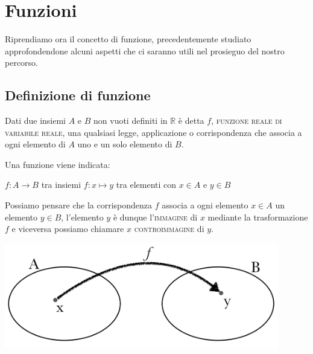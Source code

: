 

\chapter{Funzioni}

Riprendiamo ora il concetto di funzione, precedentemente studiato  
approfondendone alcuni aspetti che ci saranno utili nel prosieguo del 
nostro percorso.

\section{Definizione di funzione}
\begin{definizione}
  Dati due insiemi \(A\) e \(B\) non vuoti definiti in \(\mathbb{R}\) è detta 
\(f\), \textsc{funzione reale di variabile reale}, una qualsiasi legge, 
applicazione o corrispondenza che associa a ogni elemento di \(A\) uno e un 
solo elemento di \(B\).
\end{definizione}

\begin{minipage}{.39\textwidth}
Una funzione viene indicata:

\(f: A\to B  \)  tra insiemi   \(f: x\mapsto y\)   tra elementi  con 
\(x\in A\)  e \(y\in B\)

Possiamo pensare che la corrispondenza \(f\) associa a ogni elemento 
\(x \in A\) un elemento \(y \in B\), 
l'elemento \(y\) è dunque l'\textsc{immagine} di \(x\) mediante la 
trasformazione \(f\) 
e viceversa possiamo chiamare \(x\) \textsc{controimmagine} di \(y\).
\end{minipage}
\begin{minipage}{.59\textwidth}
\begin{center}
  \includegraphics[width=0.9\textwidth]{img/1_funz.png}
\end{center}
\end{minipage}

